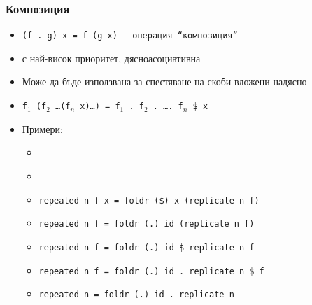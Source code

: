 \documentclass{beamer}
\begin{document}
\begin{frame}
  \frametitle{Композиция}
  \begin{itemize}[<+->]
  \item \tt{(f . g) x = f (g x)} --- операция ``композиция''
  \item с най-висок приоритет, дясноасоциативна
  \item Може да бъде използвана за спестяване на скоби вложени надясно
  \item \tt{f$_1$ (f$_2$ \ldots (f$_n$ x)\ldots)} = \tt{f$_1$ . f$_2$ . \ldots . f$_n$ \$ x}
  \item Примери:
    \begin{itemize}
    \item \tt{}
    \item \tt{}
    \item \tt{repeated n f x = foldr (\$) x (replicate n f)}
    \item \tt{repeated n f = foldr (.) id (replicate n f)}
    \item \tt{repeated n f = foldr (.) id \$ replicate n f}
    \item \tt{repeated n f = foldr (.) id . replicate n \$ f}
    \item \tt{repeated n = foldr (.) id . replicate n}
    \end{itemize}
  \end{itemize}
\end{frame}
\end{document}
